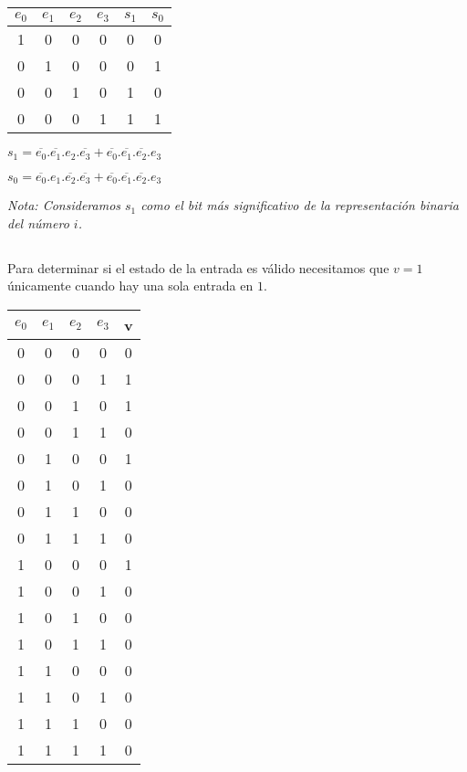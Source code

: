 \begin{tabular}{|c|c|c|c||c|c|}
    $e_0$ & $e_1$ & $e_2$ & $e_3$ & $s_1$ & $s_0$ \\
    \hline
    1 & 0 & 0 & 0 & 0 & 0 \\
    0 & 1 & 0 & 0 & 0 & 1 \\
    0 & 0 & 1 & 0 & 1 & 0 \\
    0 & 0 & 0 & 1 & 1 & 1 \\
\end{tabular}

$s_1 = \overline{e_0}.\overline{e_1}.e_2.\overline{e_3} + \overline{e_0}.\overline{e_1}.\overline{e_2}.e_3$

$s_0 = \overline{e_0}.e_1.\overline{e_2}.\overline{e_3} + \overline{e_0}.\overline{e_1}.\overline{e_2}.e_3$

\emph{Nota: Consideramos $s_1$ como el bit más significativo de la representación binaria del número $i$.}

\subsection{}

Para determinar si el estado de la entrada es válido necesitamos que $v=1$ únicamente cuando hay una sola entrada en $1$.

\begin{tabular}{|c|c|c|c||c|}
    $e_0$ & $e_1$ & $e_2$ & $e_3$ & v \\
    \hline
    0 & 0 & 0 & 0 & 0 \\
    0 & 0 & 0 & 1 & 1 \\
    0 & 0 & 1 & 0 & 1 \\
    0 & 0 & 1 & 1 & 0 \\
    0 & 1 & 0 & 0 & 1 \\
    0 & 1 & 0 & 1 & 0 \\
    0 & 1 & 1 & 0 & 0 \\
    0 & 1 & 1 & 1 & 0 \\
    1 & 0 & 0 & 0 & 1 \\
    1 & 0 & 0 & 1 & 0 \\
    1 & 0 & 1 & 0 & 0 \\
    1 & 0 & 1 & 1 & 0 \\
    1 & 1 & 0 & 0 & 0 \\
    1 & 1 & 0 & 1 & 0 \\
    1 & 1 & 1 & 0 & 0 \\
    1 & 1 & 1 & 1 & 0 \\
\end{tabular}

